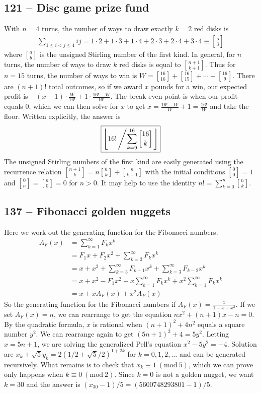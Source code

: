 \documentclass{article}
\newcommand{\stirling}[2]{\genfrac{[}{]}{0pt}{}{#1}{#2}}
\newcommand{\Mod}[1]{\ (\mathrm{mod}\ #1)}
\begin{document}
\subsection*{121 -- Disc game prize fund}  
With $n=4$ turns, the number of ways to draw exactly $k=2$ red disks is 
\begin{align*}
	\sum_{1 \leq i < j \leq 4} i j = 1\cdot2 + 1\cdot3 + 1\cdot4 + 2\cdot3 + 2\cdot4 + 3\cdot4 \equiv \stirling{5}{3}
\end{align*}
where $\stirling{a}{b}$ is the unsigned Stirling number of the first kind.
In general, for $n$ turns, the number of ways to draw $k$ red disks is equal to $\stirling{n+1}{k+1}$.
Thus for $n = 15$ turns, the number of ways to win is $W = \stirling{16}{16} + \stirling{16}{15} + \cdots + \stirling{16}{9}$. 
There are $(n+1)!$ total outcomes, so if we award $x$ pounds for a win, our expected profit is $-(x-1)\cdot\frac{W}{16!} + 1\cdot\frac{16!-W}{16!}$. 
The break-even point is when our profit equals 0, which we can then solve for $x$ to get $x = \frac{16!-W}{W}+1 = \frac{16!}{W}$ and take the floor. 
Written explicitly, the answer is
\begin{align*}
	\boxed{ \left\lfloor16! \left/ \sum_{k=9}^{16} \stirling{16}{k} \right. \right\rfloor}
\end{align*}
The unsigned Stirling numbers of the first kind are easily generated using the recurrence relation $\stirling{n+1}{k} = n\stirling{n}{k} + \stirling{n}{k-1}$ with the initial conditions $\stirling{0}{0} = 1$ and $\stirling{0}{n} = \stirling{n}{0} = 0$ for $n > 0$. 
It may help to use the identity $n! = \sum_{k=0}^n \stirling{n}{k}$.


\subsection*{137 -- Fibonacci golden nuggets} 
Here we work out the generating function for the Fibonacci numbers.
\begin{align*}
A_F(x) &= \sum\limits_{k=1}^\infty F_k x^k \\
&= F_1x + F_2x^2 + \sum\limits_{k=3}^\infty F_k x^k \\
&= x + x^2 + \sum\limits_{k=3}^\infty F_{k-1} x^k +  \sum\limits_{k=3}^\infty F_{k-2} x^k \\
&= x + x^2  - F_1x^2 + x\sum\limits_{k=1}^\infty F_k x^k +  x^2\sum\limits_{k=1}^\infty F_k x^k \\
&=  x + xA_F(x) + x^2A_F(x)
\end{align*}
So the generating function for the Fibonacci numbers if $A_F(x) = \frac{x}{1-x-x^2}$.
If we set $A_F(x) = n$, we can rearrange to get the equation $nx^2 + (n+1)x - n = 0$. 
By the quadratic formula, $x$ is rational when $(n+1)^2 + 4n^2$ equals a square number $y^2$. 
We can rearrange again to get $(5n+1)^2 + 4 = 5y^2$. 
Letting $x=5n+1$, we are solving the generalized Pell's equation $x^2 - 5y^2  = -4$. 
Solution are $x_k + \sqrt{5}y_k = 2(1/2 + \sqrt{5}/2)^{1 + 2k}$ for $k = 0, 1, 2, \dotsc$ and can be generated recursively. 
What remains is to check that $x_k \equiv 1 \Mod{5}$, which we can prove only happens when $k \equiv 0 \Mod 2$.
Since $k=0$ is not a golden nugget, we want $k=30$ and the answer is $(x_{30} - 1)/5 = \boxed{(5600748293801 - 1)/5}$.
\end{document}
